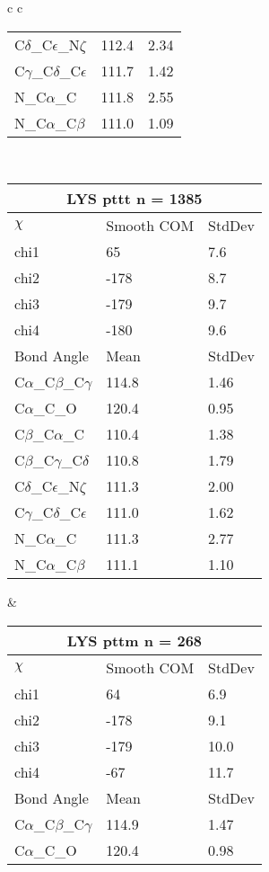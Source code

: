 \begin{longtable}{ c c }
\begin{tabular}{ l l l }
  C$\delta$\_C$\epsilon$\_N$\zeta$ & 112.4 & 2.34\\
  C$\gamma$\_C$\delta$\_C$\epsilon$ & 111.7 & 1.42\\
  N\_C$\alpha$\_C & 111.8 & 2.55\\
  N\_C$\alpha$\_C$\beta$ & 111.0 & 1.09\\
  \bottomrule
  \end{tabular}
  \\
  \begin{tabular}{ l l l }
  \toprule
  \multicolumn{3}{c}{LYS \textbf{pttt} n = 1385} \\ \toprule
  $\chi$       & Smooth COM & StdDev \\ \midrule
  chi1 & 65 & 7.6 \\ 
  chi2 & -178 & 8.7 \\ 
  chi3 & -179 & 9.7 \\ 
  chi4 & -180 & 9.6 \\ \midrule
  Bond Angle   & Mean     & StdDev \\ \midrule
  C$\alpha$\_C$\beta$\_C$\gamma$ & 114.8 & 1.46\\
  C$\alpha$\_C\_O & 120.4 & 0.95\\
  C$\beta$\_C$\alpha$\_C & 110.4 & 1.38\\
  C$\beta$\_C$\gamma$\_C$\delta$ & 110.8 & 1.79\\
  C$\delta$\_C$\epsilon$\_N$\zeta$ & 111.3 & 2.00\\
  C$\gamma$\_C$\delta$\_C$\epsilon$ & 111.0 & 1.62\\
  N\_C$\alpha$\_C & 111.3 & 2.77\\
  N\_C$\alpha$\_C$\beta$ & 111.1 & 1.10\\
  \bottomrule
  \end{tabular}
  &
  \begin{tabular}{ l l l }
  \toprule
  \multicolumn{3}{c}{LYS \textbf{pttm} n = 268} \\ \toprule
  $\chi$       & Smooth COM & StdDev \\ \midrule
  chi1 & 64 & 6.9 \\ 
  chi2 & -178 & 9.1 \\ 
  chi3 & -179 & 10.0 \\ 
  chi4 & -67 & 11.7 \\ \midrule
  Bond Angle   & Mean     & StdDev \\ \midrule
  C$\alpha$\_C$\beta$\_C$\gamma$ & 114.9 & 1.47\\
  C$\alpha$\_C\_O & 120.4 & 0.98\\

\end{tabular}
\end{longtable}
